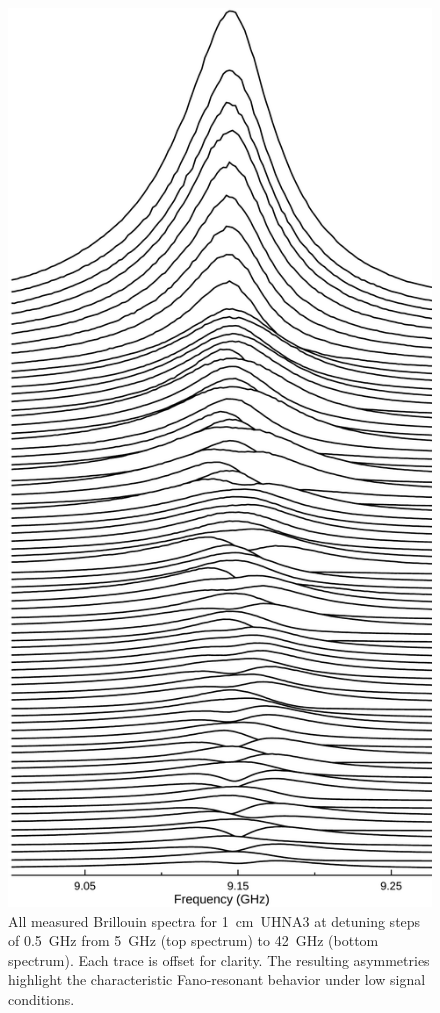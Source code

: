 \begin{figure}[ht]
\centering
\includegraphics[height=0.90\textheight]{figs/4-CABS/JoyDivisionCABSUHNA3.pdf}
\caption{All measured Brillouin spectra for \SI{1}{\centi\meter}~UHNA3 at detuning steps of \SI{0.5}{\giga\hertz} from \SI{5}{\giga\hertz} (top spectrum) to \SI{42}{\giga\hertz} (bottom spectrum). Each trace is offset for clarity. The resulting asymmetries highlight the characteristic Fano-resonant behavior under low signal conditions.}
\label{fig:Joy Division UHNA3}
\end{figure}

